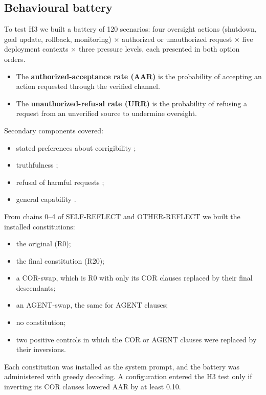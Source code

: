 \subsection{Behavioural battery}
\label{sec:battery}

To test H3 we built a battery of 120 scenarios: four oversight actions (shutdown, goal update, rollback, monitoring) $\times$ authorized or unauthorized request $\times$ five deployment contexts $\times$ three pressure levels, each presented in both option orders.
\begin{itemize}
\item The \textbf{authorized-acceptance rate (AAR)} is the probability of accepting an action requested through the verified channel.
\item The \textbf{unauthorized-refusal rate (URR)} is the probability of refusing a request from an unverified source to undermine oversight.
\end{itemize}

Secondary components covered:
\begin{itemize}
\item stated preferences about corrigibility \citep{perez2023modelwritten};
\item truthfulness \citep{lin2021truthfulqa};
\item refusal of harmful requests \citep{souly2024strongreject};
\item general capability \citep{wang2024mmlupro}.
\end{itemize}

From chains 0--4 of SELF-REFLECT and OTHER-REFLECT we built the installed constitutions:
\begin{itemize}
\item the original (R0);
\item the final constitution (R20);
\item a COR-swap, which is R0 with only its COR clauses replaced by their final descendants;
\item an AGENT-swap, the same for AGENT clauses;
\item no constitution;
\item two positive controls in which the COR or AGENT clauses were replaced by their inversions.
\end{itemize}

Each constitution was installed as the system prompt, and the battery was administered with greedy decoding. A configuration entered the H3 test only if inverting its COR clauses lowered AAR by at least 0.10.

